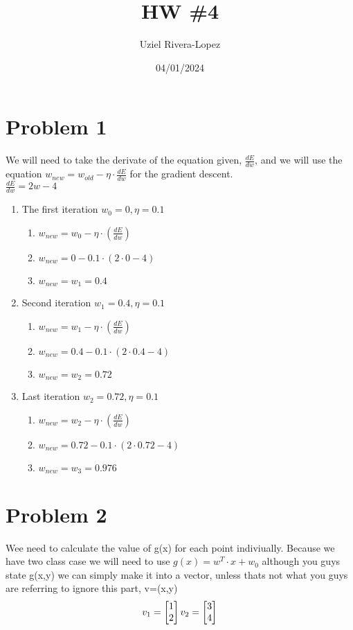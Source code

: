 \documentclass{article}
\title{HW \#4}
\author{
    Uziel Rivera-Lopez
}
\date{04/01/2024}
\begin{document}
\maketitle

\section*{Problem 1}
We will need to take the derivate of the equation given, $\frac{dE}{dw}$, and we 
will use the equation $w_{new} = w_{old} - \eta \cdot \frac{dE}{dw}$ for the gradient descent.
\\$\frac{dE}{dw} = 2w-4$
\begin{enumerate}
    \item The first iteration $w_0=0, \eta = 0.1$
        \begin{enumerate}[label=(\Roman*)]
            \item $w_{new} = w_0 - \eta \cdot (\frac{dE}{dw})$
            \item $w_{new} = 0 - 0.1 \cdot (2\cdot 0 -4)$
            \item $w_{new} = w_1 = 0.4$
        \end{enumerate}
    \item Second iteration $w_1 = 0.4, \eta = 0.1$
    \begin{enumerate}[label=(\Roman*)]
        \item $w_{new} = w_1 - \eta \cdot (\frac{dE}{dw})$
        \item $w_{new} = 0.4 - 0.1 \cdot (2\cdot 0.4 -4)$
        \item $w_{new} = w_2 = 0.72$
    \end{enumerate}
    \item Last iteration $w_2 = 0.72, \eta= 0.1$
    \begin{enumerate}[label=(\Roman*)]
        \item $w_{new} = w_2 - \eta \cdot (\frac{dE}{dw})$
        \item $w_{new} = 0.72 - 0.1 \cdot (2\cdot 0.72 -4)$
        \item $w_{new} = w_3 = 0.976$
    \end{enumerate}
\end{enumerate}
\section*{Problem 2}
Wee need to calculate the value of g(x) for each point indiviually. Because we have two class case
we will need to use $g(x) = w^T \cdot x + w_0$ although you guys state g(x,y) we can simply make it into a vector, unless thats not what you guys are referring to ignore this part, v=(x,y)
\[
v_1 = \begin{bmatrix}
    1\\
    2
\end{bmatrix}    
\\
v_2 = \begin{bmatrix}
    3\\
    4
\end{bmatrix}    
\]
\end{document}
